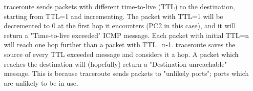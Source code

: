 traceroute sends packets with different time-to-live (TTL) to the destination, starting from TTL=1 and incrementing. The packet with TTL=1 will be decremented to 0 at the first hop it encounters (PC2 in this case), and it will return a "Time-to-live exceeded" ICMP message. Each packet with initial TTL=n will reach one hop further than a packet with TTL=n-1. traceroute saves the source of every TTL exceeded message and considers it a hop.
A packet which reaches the destination will (hopefully) return a "Destination unreachable" message. This is because traceroute sends packets to "unlikely ports"; ports which are unlikely to be in use.